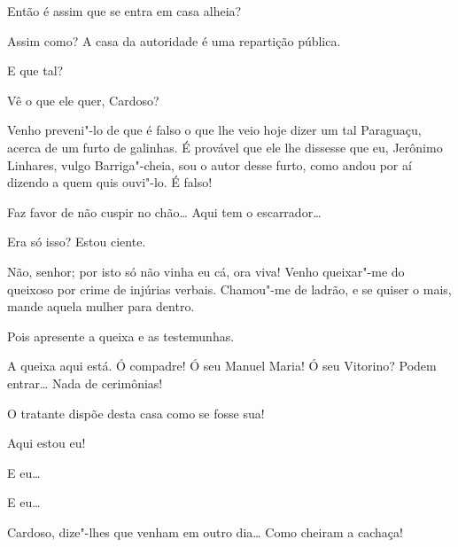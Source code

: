 

 Então é assim que se entra em casa alheia?

  Assim como? A casa da autoridade é uma
repartição pública. 

 E que tal?

 Vê o que ele quer, Cardoso?

 Venho preveni"-lo de que é falso o que lhe veio hoje dizer um
tal Paraguaçu, acerca de um furto de
galinhas. É provável que ele lhe dissesse que eu, Jerônimo Linhares,
vulgo Barriga"-cheia, sou o autor desse
furto, como andou por aí dizendo a quem quis ouvi"-lo. É falso!

  Faz favor de
não cuspir no chão\ldots{} Aqui tem o escarrador\ldots{}

 Era só isso? Estou ciente.

 Não, senhor; por isto só não vinha eu cá, ora viva! Venho
queixar"-me do queixoso por crime de
injúrias verbais. Chamou"-me de ladrão, e se quiser o mais, mande aquela
mulher para dentro. 

 Pois apresente a queixa e as testemunhas.

 A queixa aqui está.  Ó compadre! Ó seu Manuel Maria! Ó seu Vitorino? Podem
entrar\ldots{} Nada de cerimônias!

  O tratante dispõe desta casa como se
fosse sua!



  Aqui estou eu!

  E eu\ldots{}

  E eu\ldots{}

 Cardoso, dize"-lhes que venham em outro dia\ldots{}  Como cheiram a cachaça!

